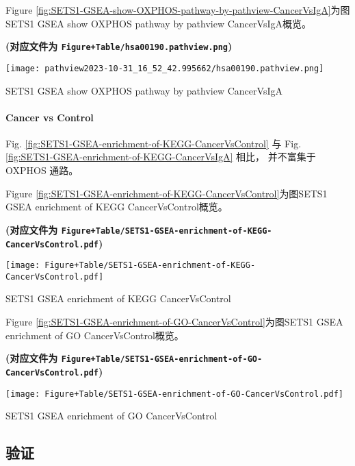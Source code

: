 \documentclass[
]{article}
\begin{document}
Figure \ref{fig:SETS1-GSEA-show-OXPHOS-pathway-by-pathview-CancerVsIgA}为图SETS1 GSEA show OXPHOS pathway by pathview CancerVsIgA概览。

\textbf{(对应文件为 \texttt{Figure+Table/hsa00190.pathview.png})}

\def\@captype{figure}
\begin{center}
\texttt{[image: pathview2023-10-31\_16\_52\_42.995662/hsa00190.pathview.png]}
\caption{SETS1 GSEA show OXPHOS pathway by pathview CancerVsIgA}\label{fig:SETS1-GSEA-show-OXPHOS-pathway-by-pathview-CancerVsIgA}
\end{center}

\hypertarget{cancer-vs-control}{%
\paragraph{Cancer vs Control}\label{cancer-vs-control}}

Fig. \ref{fig:SETS1-GSEA-enrichment-of-KEGG-CancerVsControl} 与 Fig. \ref{fig:SETS1-GSEA-enrichment-of-KEGG-CancerVsIgA} 相比，
并不富集于 OXPHOS 通路。

Figure \ref{fig:SETS1-GSEA-enrichment-of-KEGG-CancerVsControl}为图SETS1 GSEA enrichment of KEGG CancerVsControl概览。

\textbf{(对应文件为 \texttt{Figure+Table/SETS1-GSEA-enrichment-of-KEGG-CancerVsControl.pdf})}

\def\@captype{figure}
\begin{center}
\texttt{[image: Figure+Table/SETS1-GSEA-enrichment-of-KEGG-CancerVsControl.pdf]}
\caption{SETS1 GSEA enrichment of KEGG CancerVsControl}\label{fig:SETS1-GSEA-enrichment-of-KEGG-CancerVsControl}
\end{center}

Figure \ref{fig:SETS1-GSEA-enrichment-of-GO-CancerVsControl}为图SETS1 GSEA enrichment of GO CancerVsControl概览。

\textbf{(对应文件为 \texttt{Figure+Table/SETS1-GSEA-enrichment-of-GO-CancerVsControl.pdf})}

\def\@captype{figure}
\begin{center}
\texttt{[image: Figure+Table/SETS1-GSEA-enrichment-of-GO-CancerVsControl.pdf]}
\caption{SETS1 GSEA enrichment of GO CancerVsControl}\label{fig:SETS1-GSEA-enrichment-of-GO-CancerVsControl}
\end{center}

\hypertarget{flow-valid}{%
\subsection{验证}\label{flow-valid}}
\end{document}
